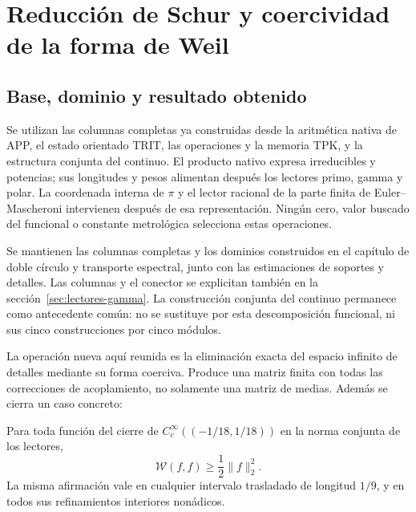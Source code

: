 \clearpage
\section{Reducción de Schur y coercividad de la forma de Weil}
\label{sec:schur-coercividad}


\subsection{Base, dominio y resultado obtenido}
\label{schur-add-sub-6}

Se utilizan las columnas completas ya construidas desde la aritmética nativa
de APP, el estado orientado TRIT, las operaciones y la memoria TPK, y la
estructura conjunta del continuo. El producto nativo expresa irreducibles y
potencias; sus longitudes y pesos alimentan después los lectores primo,
gamma y polar. La coordenada interna de \(\pi\) y el lector racional de la parte
finita de Euler--Mascheroni intervienen después de esa representación. Ningún
cero, valor buscado del funcional o constante metrológica selecciona estas
operaciones.

Se mantienen las columnas completas y los dominios construidos en el
capítulo de doble círculo y transporte espectral, junto con las estimaciones
de soportes y detalles. Las columnas y el conector se explicitan también en
la sección~\ref{sec:lectores-gamma}. La construcción conjunta
del continuo permanece como antecedente común: no se sustituye por esta
descomposición funcional, ni sus cinco construcciones por cinco módulos.

La operación nueva aquí reunida es la eliminación exacta del espacio
infinito de detalles mediante su forma coerciva. Produce una matriz finita
con todas las correcciones de acoplamiento, no solamente una matriz de
medias. Además se cierra un caso concreto:

Para toda función del cierre de
\(C_c^\infty((-1/18,1/18))\) en la norma conjunta de los lectores,
\begin{equation}
\mathscr W(f,f)\geq\frac12\|f\|_2^2.
\label{schur-add-display-1}
\end{equation}
La misma afirmación vale en cualquier intervalo trasladado de longitud
\(1/9\), y en todos sus refinamientos interiores nonádicos.

